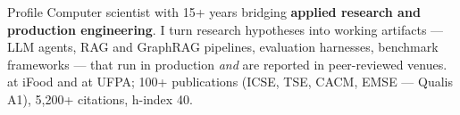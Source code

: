 \begin{rubric}{Profile}
\entry*
  Computer scientist with 15+ years bridging \textbf{applied research and production engineering}.
  I turn research hypotheses into working artifacts --- LLM agents, RAG and GraphRAG pipelines,
  evaluation harnesses, benchmark frameworks --- that run in production \emph{and} are reported in
  peer-reviewed venues.  at iFood and  at UFPA;
  100+ publications (ICSE, TSE, CACM, EMSE --- Qualis A1), 5{,}200+ citations, h-index 40.
\end{rubric}
